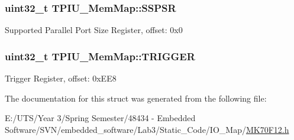 \subsubsection[{S\+S\+P\+S\+R}]{\setlength{\rightskip}{0pt plus 5cm}uint32\+\_\+t T\+P\+I\+U\+\_\+\+Mem\+Map\+::\+S\+S\+P\+S\+R}\label{struct_t_p_i_u___mem_map_a3570cf26e2ddc1d5700776743b0506e3}
Supported Parallel Port Size Register, offset\+: 0x0 \hypertarget{struct_t_p_i_u___mem_map_a267271b4e2d7ad48cba1614440c741fb}{}
\subsubsection[{T\+R\+I\+G\+G\+E\+R}]{\setlength{\rightskip}{0pt plus 5cm}uint32\+\_\+t T\+P\+I\+U\+\_\+\+Mem\+Map\+::\+T\+R\+I\+G\+G\+E\+R}\label{struct_t_p_i_u___mem_map_a267271b4e2d7ad48cba1614440c741fb}
Trigger Register, offset\+: 0x\+E\+E8 

The documentation for this struct was generated from the following file\+:\begin{DoxyCompactItemize}
\item 
E\+:/\+U\+T\+S/\+Year 3/\+Spring Semester/48434 -\/ Embedded Software/\+S\+V\+N/embedded\+\_\+software/\+Lab3/\+Static\+\_\+\+Code/\+I\+O\+\_\+\+Map/\hyperlink{_m_k70_f12_8h}{M\+K70\+F12.\+h}\end{DoxyCompactItemize}
